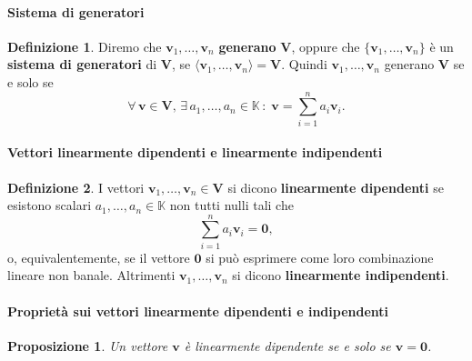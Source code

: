 \documentclass{article}
\theoremstyle{plain}
\newtheorem{prop}[thm]{Proposizione}
\theoremstyle{definition}
\newtheorem{defn}{Definizione}[section]
\theoremstyle{remark}
\begin{document}
\vspace{10pt}

\paragraph{Sistema di generatori}
\begin{bxthm}
\begin{defn}
    Diremo che \( \mathbf{v}_1, \ldots, \mathbf{v}_n \) \textbf{generano} \( \mathbf{V} \), oppure che \( \{\mathbf{v}_1, \ldots, \mathbf{v}_n\} \) è un \textbf{sistema di generatori} di \( \mathbf{V} \), se \( \langle\mathbf{v}_1, \ldots, \mathbf{v}_n\rangle = \mathbf{V} \). 
Quindi \( \mathbf{v}_1, \ldots, \mathbf{v}_n \) generano \( \mathbf{V} \) se e solo se
\[
    \forall\,\mathbf{v} \in \mathbf{V},\,\exists\, a_1, \ldots, a_n \in \mathbb{K}\,:\; \mathbf{v} = \sum_{i=1}^{n}a_i\mathbf{v}_i.
\]
\end{defn}
\end{bxthm}

\vspace{10pt}

\paragraph{Vettori linearmente dipendenti e linearmente indipendenti}
\begin{bxthm}
\begin{defn}
    I vettori \( \mathbf{v}_1, \ldots, \mathbf{v}_n \in \mathbf{V} \) si dicono \textbf{linearmente dipendenti} se esistono scalari \( a_1, \ldots, a_n \in \mathbb{K} \) non tutti nulli tali che
    \[
        \sum_{i=1}^{n}a_i\mathbf{v}_i = \mathbf{0},
    \]
    o, equivalentemente, se il vettore $\mathbf{0}$ si può esprimere come loro combinazione lineare non banale.
    Altrimenti \( \mathbf{v}_1, \ldots, \mathbf{v}_n \) si dicono \textbf{linearmente indipendenti}.
\end{defn}
\end{bxthm}

\vspace{10pt}

\paragraph{Proprietà sui vettori linearmente dipendenti e indipendenti}
\begin{bxthm}
\begin{prop}
    Un vettore \( \mathbf{v} \) è linearmente dipendente se e solo se \( \mathbf{v} = \mathbf{0} \).
\end{prop}
\end{bxthm}
\end{document}
